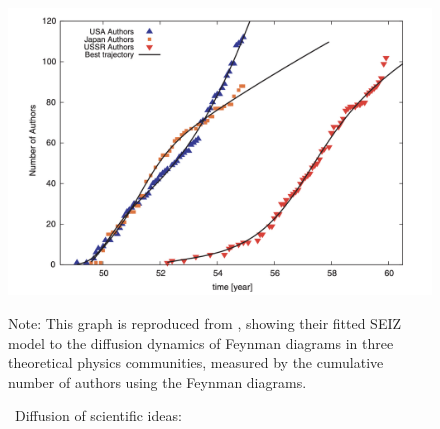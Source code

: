 	\begin{figure}[!ht] \centering  %
		\caption{ ~Diffusion of scientific ideas: \href{http://web.mit.edu/dikaiser/www/BAKC.PhysA.pdf}{\cite{bettencourt2006power}}}
		\label{fig:science_ideas_curve}
		\centerline{\includegraphics[width=\textwidth]{./figures/Feynman.png}}
		\begin{flushleft}{\footnotesize Note: This graph is reproduced from \cite{bettencourt2006power}, showing their fitted SEIZ model to the diffusion dynamics of Feynman diagrams in three theoretical physics communities, measured by the cumulative number of authors using the Feynman diagrams.}
		\end{flushleft}
	\end{figure}
